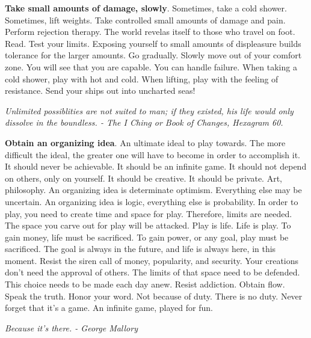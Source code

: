\documentclass[a4paper,hidelinks]{article}
\begin{document}
\textbf{Take small amounts of damage, slowly}.
Sometimes, take a cold shower.
Sometimes, lift weights.
Take controlled small amounts of damage and pain.
Perform rejection therapy.
The world revelas itself to those who travel on foot.
Read.
Test your limits.
Exposing yourself to small amounts of displeasure builds tolerance for the larger amounts.
Go gradually.
Slowly move out of your comfort zone.
You will see that you are capable.
You can handle failure.
When taking a cold shower, play with hot and cold.
When lifting, play with the feeling of resistance.
Send your ships out into uncharted seas!

\newpage


\begin{center}
\textit{Unlimited possiblities are not suited to man; if they existed, his life would only dissolve in the boundless. - The I Ching or Book of Changes, Hexagram 60.}
\end{center}

\textbf{Obtain an organizing idea}.
An ultimate ideal to play towards.
The more difficult the ideal, the greater one will have to become in order to accomplish it.
It should never be achievable.
It should be an infinite game.
It should not depend on others, only on yourself.
It should be creative.
It should be private.
Art, philosophy.
An organizing idea is determinate optimism.
Everything else may be uncertain.
An organizing idea is logic, everything else is probability.
In order to play, you need to create time and space for play.
Therefore, limits are needed.
The space you carve out for play will be attacked.
Play is life.
Life is play.
To gain money, life must be sacrificed.
To gain power, or any goal, play must be sacrificed.
The goal is always in the future, and life is always here, in this moment.
Resist the siren call of money, popularity, and security.
Your creations don't need the approval of others.
The limits of that space need to be defended.
This choice needs to be made each day anew.
Resist addiction.
Obtain flow.
Speak the truth.
Honor your word.
Not because of duty.
There is no duty.
Never forget that it's a game.
An infinite game, played for fun.

\newpage

\begin{center}
\textit{
Because it's there. - George Mallory
}
\end{center}
\end{document}
